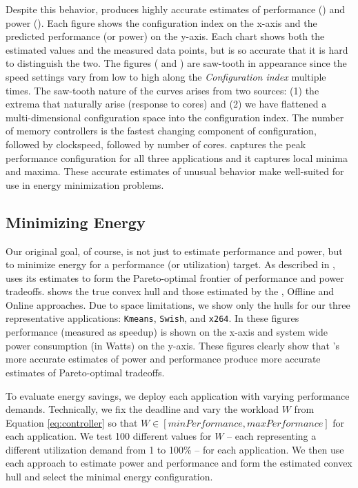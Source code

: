 Despite this behavior, \SYSTEMLEO{} produces highly accurate estimates of
performance () and power ().  Each
figure shows the configuration index on the x-axis and the predicted
performance (or power) on the y-axis.  Each chart shows both the
estimated values and the measured data points, but \SYSTEMLEO{} is so
accurate that it is hard to distinguish the two. The figures
( and  ) are saw-tooth in
appearance since the speed settings vary from low to high along the
\textit{Configuration index} multiple times. The saw-tooth nature of
the curves arises from two sources: (1) the extrema that naturally
arise (\eg response to cores) and (2) we have flattened a
multi-dimensional configuration space into the configuration index.
The number of memory controllers is the fastest changing component of
configuration, followed by clockspeed, followed by number of cores.
\SYSTEMLEO{} captures the peak performance configuration for all three
applications and it captures local minima and maxima.  These accurate
estimates of unusual behavior make \SYSTEMLEO{} well-suited for use in
energy minimization problems.

\subsection{Minimizing Energy}
\label{sec:experiment:LP}
Our original goal, of course, is not just to estimate performance and
power, but to minimize energy for a performance (or utilization)
target.  As described in , \SYSTEMLEO{} uses its estimates to
form the Pareto-optimal frontier of performance and power tradeoffs.
 shows the true convex hull and those estimated by
the \SYSTEMLEO{}, Offline and Online approaches.  Due to space
limitations, we show only the hulls for our three representative
applications: \texttt{Kmeans}, \texttt{Swish}, and \texttt{x264}.  In
these figures performance (measured as speedup) is shown on the x-axis
and system wide power consumption (in Watts) on the y-axis.  These
figures clearly show that \SYSTEMLEO{}'s more accurate estimates of power
and performance produce more accurate estimates of Pareto-optimal
tradeoffs.

To evaluate energy savings, we deploy each application with varying
performance demands.  Technically, we fix the deadline and vary the
workload $W$ from Equation \ref{eq:controller} so that $W \in
[minPerformance , maxPerformance]$ for each application.  We test 100
different values for $W$ -- each representing a different utilization
demand from 1 to 100\% -- for each application.  We then use each
approach to estimate power and performance and form the estimated
convex hull and select the minimal energy configuration.

